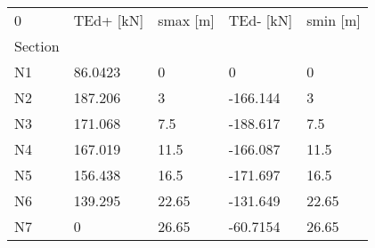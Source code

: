 \begin{tabular}{lllll}
\toprule
0 & TEd+ [kN] & smax [m] & TEd- [kN] & smin [m] \\
Section &           &          &           &          \\
\midrule
N1      &   86.0423 &        0 &         0 &        0 \\
N2      &   187.206 &        3 &  -166.144 &        3 \\
N3      &   171.068 &      7.5 &  -188.617 &      7.5 \\
N4      &   167.019 &     11.5 &  -166.087 &     11.5 \\
N5      &   156.438 &     16.5 &  -171.697 &     16.5 \\
N6      &   139.295 &    22.65 &  -131.649 &    22.65 \\
N7      &         0 &    26.65 &  -60.7154 &    26.65 \\
\bottomrule
\end{tabular}
